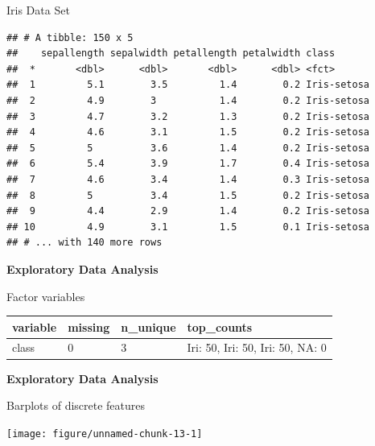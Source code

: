 \documentclass[11pt,compress,t,notes=noshow, xcolor=table]{beamer}
\makeatletter
\newenvironment{kframe}{%
 \def\at@end@of@kframe{}%
 \ifinner\ifhmode%
  \def\at@end@of@kframe{\end{minipage}}%
  \begin{minipage}{\columnwidth}%
 \fi\fi%
 \def\FrameCommand##1{\hskip\@totalleftmargin \hskip-\fboxsep
 \colorbox{shadecolor}{##1}\hskip-\fboxsep
     \hskip-\linewidth \hskip-\@totalleftmargin \hskip\columnwidth}%
 \MakeFramed {\advance\hsize-\width
   \@totalleftmargin\z@ \linewidth\hsize
   \@setminipage}}%
 {\par\unskip\endMakeFramed%
 \at@end@of@kframe}
\newenvironment{knitrout}{}{} %
\makeatother
\begin{document}
\begin{vbframe}{Iris Data Set}
\begin{knitrout}\scriptsize
{}\color{fgcolor}\begin{kframe}
\begin{verbatim}
## # A tibble: 150 x 5
##    sepallength sepalwidth petallength petalwidth class      
##  *       <dbl>      <dbl>       <dbl>      <dbl> <fct>      
##  1         5.1        3.5         1.4        0.2 Iris-setosa
##  2         4.9        3           1.4        0.2 Iris-setosa
##  3         4.7        3.2         1.3        0.2 Iris-setosa
##  4         4.6        3.1         1.5        0.2 Iris-setosa
##  5         5          3.6         1.4        0.2 Iris-setosa
##  6         5.4        3.9         1.7        0.4 Iris-setosa
##  7         4.6        3.4         1.4        0.3 Iris-setosa
##  8         5          3.4         1.5        0.2 Iris-setosa
##  9         4.4        2.9         1.4        0.2 Iris-setosa
## 10         4.9        3.1         1.5        0.1 Iris-setosa
## # ... with 140 more rows
\end{verbatim}
\end{kframe}
\end{knitrout}

\framebreak

\textbf{Exploratory Data Analysis}

Factor variables

\begin{table}[H]
\centering\begingroup\fontsize{7}{9}\selectfont

\begin{tabular}{llll}
\toprule
variable & missing & n\_unique & top\_counts\\
\midrule
class & 0 & 3 & Iri: 50, Iri: 50, Iri: 50, NA: 0\\
\bottomrule
\end{tabular}\endgroup{}
\end{table}



\textbf{Exploratory Data Analysis}

Barplots of discrete features

\begin{knitrout}\scriptsize
{}\color{fgcolor}

{\centering \texttt{[image: figure/unnamed-chunk-13-1]} 

}



\end{knitrout}


\end{vbframe}
\end{document}

